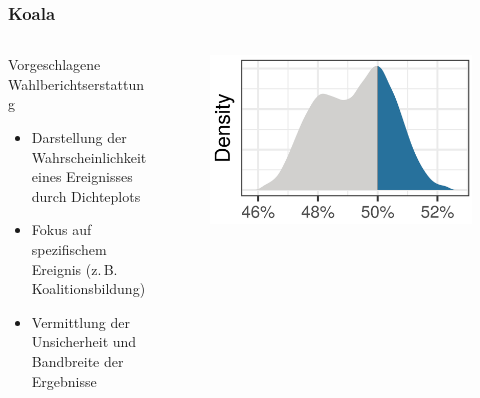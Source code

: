 \documentclass[aspectratio=169,xcolor=dvipsnames]{beamer}
\begin{document}
\begin{frame}
	\frametitle{Koala}
	\begin{columns}
		\begin{column}{0.6\textwidth}
			Vorgeschlagene Wahlberichtserstattung
			\begin{itemize}
				\item Darstellung der Wahrscheinlichkeit eines Ereignisses durch Dichteplots
				\item Fokus auf spezifischem Ereignis (z.\,B. Koalitionsbildung)
				\item Vermittlung der Unsicherheit und Bandbreite der Ergebnisse
			\end{itemize}
		\end{column}
		\begin{column}{0.4\textwidth}
			\begin{figure}
				\includegraphics[width=\textwidth]{poe}
			\end{figure}
		\end{column}
	\end{columns}
\end{frame}
\end{document}
